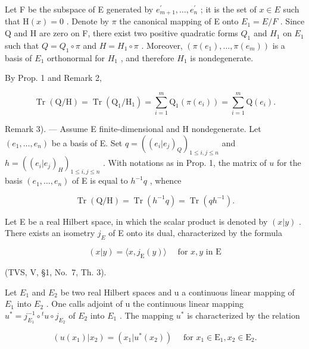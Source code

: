 Let F be the subspace of E generated by \(e_{m+1}^{\prime},\ldots,e_{n}^{\prime}\) ; it is the set of \(x\in E\) such that \(\mathrm{H}(x)=0\) . Denote by \(\pi\) the canonical mapping of E onto \(E_{1}=E/F\) . Since Q and H are zero on F, there exist two positive quadratic forms \(Q_{1}\) and \(H_{1}\) on \(E_{1}\) such that \(Q=Q_{1}\circ\pi\) and \(H=H_{1}\circ\pi\) . Moreover, \((\pi(e_{1}),\ldots,\pi(e_{m}))\) is a basis of \(E_{1}\) orthonormal for \(H_{1}\) , and therefore \(H_{1}\) is nondegenerate.

By Prop. 1 and Remark 2,

\[
\operatorname{Tr} \left(\mathrm{Q} / \mathrm{H}\right) = \operatorname{Tr} \left(\mathrm{Q} _ {1} / \mathrm{H} _ {1}\right) = \sum_ {i = 1} ^ {m} \mathrm{Q} _ {1} \left(\pi (e _ {i})\right) = \sum_ {i = 1} ^ {m} \mathrm{Q} (e _ {i}).\tag{Q.E.D.}
\]

Remark 3). --- Assume E finite-dimensional and H nondegenerate. Let \((e_1, \ldots, e_n)\) be a basis of E. Set \(q = ((e_i | e_j)_Q)_{1 \leqslant i, j \leqslant n}\) and \(h = ((e_i | e_j)_H)_{1 \leqslant i, j \leqslant n}\) . With notations as in Prop. 1, the matrix of \(u\) for the basis \((e_1, \ldots, e_n)\) of E is equal to \(h^{-1}q\) , whence

\[
\operatorname{Tr} \left(\mathrm{Q} / \mathrm{H}\right) = \operatorname{Tr} \left(h ^ {- 1} q\right) = \operatorname{Tr} \left(q h ^ {- 1}\right).\tag{2}
\]


Let E be a real Hilbert space, in which the scalar product is denoted by \((x|y)\) . There exists an isometry \(j_{E}\) of E onto its dual, characterized by the formula

\[
(x | y) = \langle x, j _ {\mathrm{E}} (y) \rangle \quad \text { for } x, y \text { in } \mathrm{E}\tag{3}
\]

(TVS, V, §1, No.~7, Th. 3).

Let \(E_{1}\) and \(E_{2}\) be two real Hilbert spaces and u a continuous linear mapping of \(E_{1}\) into \(E_{2}\) . One calls adjoint of u the continuous linear mapping \(u^{*} = j_{E_{1}}^{-1} \circ {}^{t}u \circ j_{E_{2}}\) of \(E_{2}\) into \(E_{1}\) . The mapping \(u^{*}\) is characterized by the relation

\[
(u (x _ {1}) | x _ {2}) = (x _ {1} | u ^ {*} (x _ {2})) \quad \text { for } x _ {1} \in \mathrm{E} _ {1}, x _ {2} \in \mathrm{E} _ {2}.\tag{4}
\]

